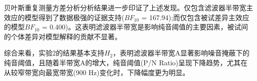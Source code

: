 \documentclass[jou,12pt,floatsintext]{apa7} %
\begin{document}
贝叶斯重复测量方差分析分析结果进一步印证了上述发现。仅包含滤波器半带宽主效应的模型得到了数据极强的证据支持(\(BF_{10}\) = 167.94);而仅包含被试差异主效应的模型\(BF_{10}\) = 0.400)。这表明滤波器半带宽是影响纯音阈值的主要因素，被试间的个体差异对模型解释的贡献不显著。

综合来看，实验2的结果基本支持\(H_2\)，表明滤波器半带宽A显著影响噪音掩蔽下的纯音阈值，且随着半带宽A的增大，纯音阈值(P/N Ratio)呈现下降趋势，尤其在从较窄带宽向最宽带宽(900 Hz)变化时，下降幅度更为明显。




    
    
    
    
\end{document}
